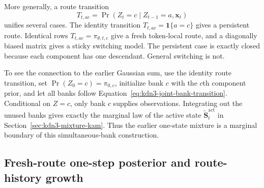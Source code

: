 \documentclass[11pt]{article}
\newcommand{\ve}[1]{\boldsymbol{#1}}
\begin{document}
More generally, a route transition
\begin{equation}
  T_{t,ac}
  =\Pr(Z_t=c\mid Z_{t-1}=a,\ve{x}_t)
  \label{eq:kdn3-route-transition}
\end{equation}
unifies several cases.  The identity transition
$T_{t,ac}=\mathbf{1}\{a=c\}$ gives a persistent route.  Identical rows
$T_{t,ac}=\pi_{\theta,t,c}$ give a fresh token-local route, and a diagonally biased matrix gives a
sticky switching model.  The persistent case is exactly closed because each component has one
descendant.  General switching is not.

To see the connection to the earlier Gaussian sum, use the identity route transition, set
$\Pr(Z_0=c)=\pi_{0,c}$, initialize bank $c$ with the $c$th component prior, and let all banks follow
Equation~\eqref{eq:kdn3-joint-bank-transition}.  Conditional on $Z=c$, only bank $c$ supplies
observations.  Integrating out the unused banks gives exactly the marginal law of the active state
$\widetilde{\ve{S}}_t^{\mathrm{act}}$ in
Section~\ref{sec:kdn3-mixture-kam}.  Thus the earlier one-state mixture is a marginal boundary of
this simultaneous-bank construction.

\subsection{Fresh-route one-step posterior and route-history growth}
\label{sec:kdn3-routed-exact}
\end{document}
